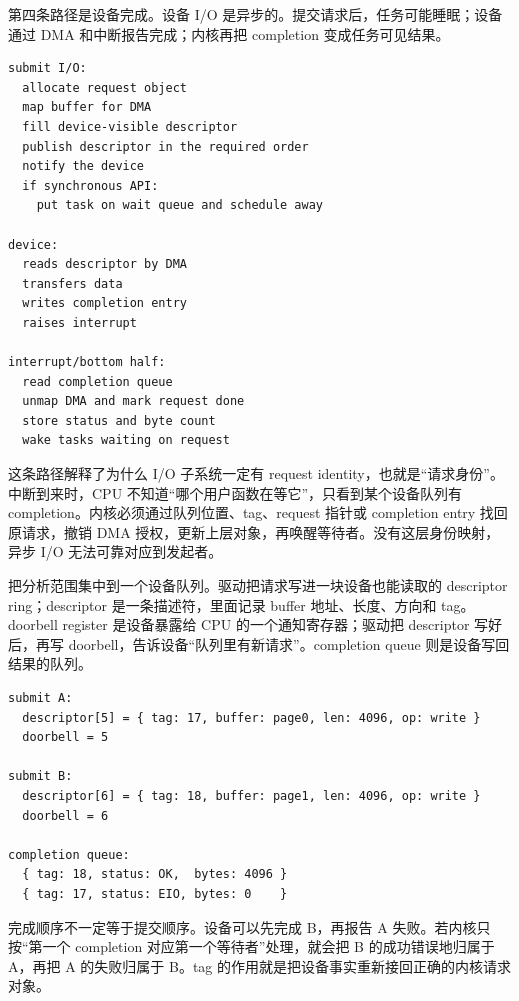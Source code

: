 第四条路径是设备完成。设备 I/O 是异步的。提交请求后，任务可能睡眠；设备通过 DMA 和中断报告完成；内核再把 completion 变成任务可见结果。

\begin{lstlisting}
submit I/O:
  allocate request object
  map buffer for DMA
  fill device-visible descriptor
  publish descriptor in the required order
  notify the device
  if synchronous API:
    put task on wait queue and schedule away

device:
  reads descriptor by DMA
  transfers data
  writes completion entry
  raises interrupt

interrupt/bottom half:
  read completion queue
  unmap DMA and mark request done
  store status and byte count
  wake tasks waiting on request
\end{lstlisting}

这条路径解释了为什么 I/O 子系统一定有 request identity，也就是“请求身份”。中断到来时，CPU 不知道“哪个用户函数在等它”，只看到某个设备队列有 completion。内核必须通过队列位置、tag、request 指针或 completion entry 找回原请求，撤销 DMA 授权，更新上层对象，再唤醒等待者。没有这层身份映射，异步 I/O 无法可靠对应到发起者。

把分析范围集中到一个设备队列。驱动把请求写进一块设备也能读取的 descriptor ring；descriptor 是一条描述符，里面记录 buffer 地址、长度、方向和 tag。doorbell register 是设备暴露给 CPU 的一个通知寄存器；驱动把 descriptor 写好后，再写 doorbell，告诉设备“队列里有新请求”。completion queue 则是设备写回结果的队列。

\begin{lstlisting}
submit A:
  descriptor[5] = { tag: 17, buffer: page0, len: 4096, op: write }
  doorbell = 5

submit B:
  descriptor[6] = { tag: 18, buffer: page1, len: 4096, op: write }
  doorbell = 6

completion queue:
  { tag: 18, status: OK,  bytes: 4096 }
  { tag: 17, status: EIO, bytes: 0    }
\end{lstlisting}

完成顺序不一定等于提交顺序。设备可以先完成 B，再报告 A 失败。若内核只按“第一个 completion 对应第一个等待者”处理，就会把 B 的成功错误地归属于 A，再把 A 的失败归属于 B。tag 的作用就是把设备事实重新接回正确的内核请求对象。

